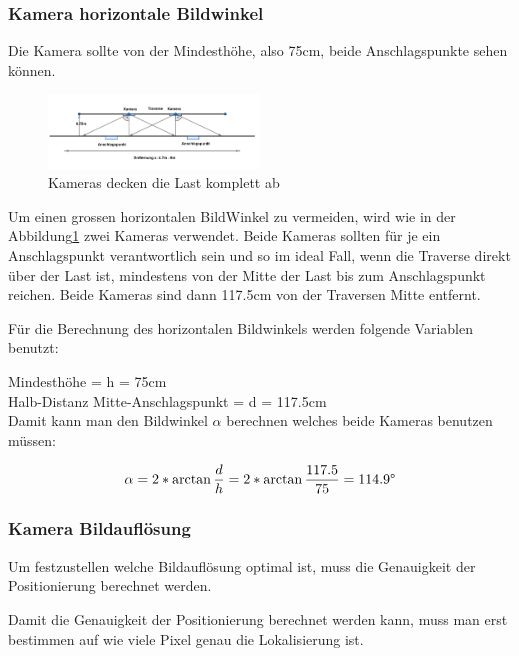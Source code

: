 \subsubsection{Kamera horizontale Bildwinkel}

Die Kamera sollte von der Mindesthöhe, also 75cm, beide Anschlagspunkte sehen können.

\begin{figure}[H]
    \centering
    \includegraphics[width=0.5\textwidth]{graphics/KameraFOV.png}\hfill%
    \caption{Kameras decken die Last komplett ab}
    \label{fig:FOV}
\end{figure}

Um einen grossen horizontalen BildWinkel zu vermeiden, wird wie in der Abbildung\ref{fig:FOV} zwei Kameras verwendet. 
Beide Kameras sollten für je ein Anschlagspunkt verantwortlich sein und so im ideal Fall, wenn die Traverse direkt über der Last ist, mindestens von der Mitte der Last bis zum Anschlagspunkt reichen.
Beide Kameras sind dann 117.5cm von der Traversen Mitte entfernt.

Für die Berechnung des horizontalen Bildwinkels werden folgende Variablen benutzt:

Mindesthöhe = h = 75cm\\
Halb-Distanz Mitte-Anschlagspunkt = d = 117.5cm\\

Damit kann man den Bildwinkel \(\alpha\) berechnen welches beide Kameras benutzen müssen:

\begin{equation}
    \alpha = 2*\arctan\frac{d}{h} = 2*\arctan\frac{117.5}{75} = 114.9\degree
    \label{eq:FOV}
\end{equation}


\subsubsection{Kamera Bildauflösung}
Um festzustellen welche Bildauflösung optimal ist, muss die Genauigkeit der Positionierung berechnet werden.

Damit die Genauigkeit der Positionierung berechnet werden kann, muss man erst bestimmen auf wie viele Pixel genau die Lokalisierung ist.

